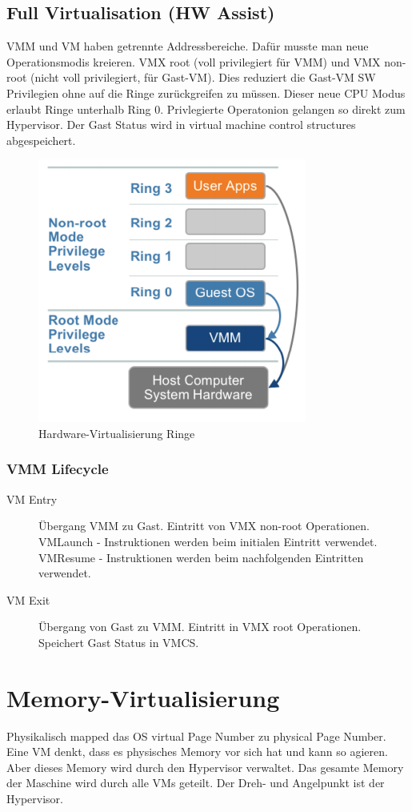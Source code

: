 \newpage

\subsection{Full Virtualisation (HW Assist)}
\label{sec:hw-unterstuetzt-virt}
VMM und VM haben getrennte Addressbereiche. Dafür musste man neue Operationsmodis kreieren. VMX root (voll privilegiert für VMM) und VMX non-root (nicht voll privilegiert, für Gast-VM). Dies reduziert die Gast-VM SW Privilegien ohne auf die Ringe zurückgreifen zu müssen. Dieser neue CPU Modus erlaubt Ringe unterhalb Ring 0. Privlegierte Operatonion gelangen so direkt zum Hypervisor. Der Gast Status wird in virtual machine control structures abgespeichert.
\begin{figure}[h!]
\centering
\includegraphics[width=0.3\linewidth]{fig/hw-virtualisierung-ringe}
\caption{Hardware-Virtualisierung Ringe}
\label{fig:hw-virtualisierung-ringe}
\end{figure}

\subsubsection{VMM Lifecycle}
\label{sec:vmm-lifecycle}
\begin{description}
	\item[VM Entry] Übergang VMM zu Gast. Eintritt von VMX non-root Operationen. VMLaunch - Instruktionen werden beim initialen Eintritt verwendet. VMResume - Instruktionen werden beim nachfolgenden Eintritten verwendet.
	\item[VM Exit] Übergang von Gast zu VMM. Eintritt in VMX root Operationen. Speichert Gast Status in VMCS.
\end{description}

\section{Memory-Virtualisierung}
Physikalisch mapped das OS virtual Page Number zu physical Page Number. Eine VM denkt, dass es physisches Memory vor sich hat und kann so agieren. Aber dieses Memory wird durch den Hypervisor verwaltet. Das gesamte Memory der Maschine wird durch alle VMs geteilt. Der Dreh- und Angelpunkt ist der Hypervisor.

